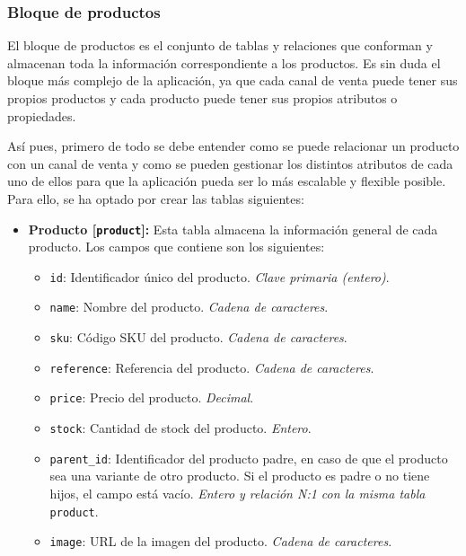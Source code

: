 \subsubsection{Bloque de productos}

El bloque de productos es el conjunto de tablas y relaciones que conforman y almacenan toda la información correspondiente a los productos. Es sin duda el bloque más complejo de la aplicación, ya que cada canal de venta puede tener sus propios productos y cada producto puede tener sus propios atributos o propiedades.

Así pues, primero de todo se debe entender como se puede relacionar un producto con un canal de venta y como se pueden gestionar los distintos atributos de cada uno de ellos para que la aplicación pueda ser lo más escalable y flexible posible. Para ello, se ha optado por crear las tablas siguientes:

\begin{itemize}
    \item \textbf{Producto [\texttt{product}]:} Esta tabla almacena la información general de cada producto. Los campos que contiene son los siguientes:
          \begin{itemize}
              \item \texttt{id}: Identificador único del producto. \textit{Clave primaria (entero)}.
              \item \texttt{name}: Nombre del producto. \textit{Cadena de caracteres}.
              \item \texttt{sku}: Código SKU del producto. \textit{Cadena de caracteres}.
              \item \texttt{reference}: Referencia del producto. \textit{Cadena de caracteres}.
              \item \texttt{price}: Precio del producto. \textit{Decimal}.
              \item \texttt{stock}: Cantidad de stock del producto. \textit{Entero}.
              \item \texttt{parent\_id}: Identificador del producto padre, en caso de que el producto sea una variante de otro producto. Si el producto es padre o no tiene hijos, el campo está vacío. \textit{Entero y relación N:1 con la misma tabla} \texttt{product}.
              \item \texttt{image}: URL de la imagen del producto. \textit{Cadena de caracteres}.
          \end{itemize}
\end{itemize}

